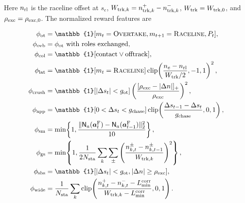 \documentclass[journal,twoside,web]{ieeecolor}
\begin{document}
\begin{samepage}
Here \(n_{\rm rl}\) is the raceline offset at \(s_e\),
\(W_{{\rm trk},k}=n_{{\rm trk},k}^{+}-n_{{\rm trk},k}^{-}\),
\(W_{\rm trk}=W_{{\rm trk},0}\), and
\(\rho_{\rm exc}=\rho_{{\rm exc},0}\). The normalized reward features are
\par
\end{samepage}
\begingroup
\scriptsize
\setlength{\jot}{0.5pt}
\begin{equation}
\begin{aligned}
\phi_{\rm ot}&=\mathbb{1}[m_t=\textsc{Overtake},
m_{t+1}=\textsc{Raceline},P_t],\\
\phi_{\rm ovb}&=\phi_{\rm ot}\text{ with roles exchanged},\\
\phi_{\rm col}&=\mathbb{1}[\mathrm{contact}\vee\mathrm{offtrack}],\\
\phi_{\rm lat}&=\mathbb{1}[m_t=\textsc{Raceline}]
\operatorname{clip}\!\left(\frac{n_e-n_{\rm rl}}{W_{\rm trk}/2},-1,1\right)^2,\\
\phi_{\rm crush}&=\mathbb{1}[|\Delta s_t|<g_{\rm ot}]
\left(\frac{[\rho_{\rm exc}-|\Delta n|]_+}{\rho_{\rm exc}}\right)^2,\\
\phi_{\rm app}&=\mathbb{1}[0<\Delta s_t<g_{\rm chase}]
\operatorname{clip}\!\left(\frac{\Delta s_{t-1}-\Delta s_t}{g_{\rm chase}},0,1\right),\\
\phi_{\rm sm}&=\min\!\left\{1,
\frac{\|\mathsf N_a(\bm a_t^{\rm F})-
\mathsf N_a(\bm a_{t-1}^{\rm F})\|_2^2}{10}\right\},\\
\phi_{\rm gs}&=\min\!\left\{1,\frac{1}{2N_{\rm sta}}
\sum_k\sum_{\pm}\left(\frac{n_{k,t}^{\pm}-n_{k,t-1}^{\pm}}
{W_{{\rm trk},k}}\right)^2\right\},\\
\phi_{\rm sbs}&=\mathbb{1}[|\Delta s_t|<g_{\rm ot},
|\Delta n|\ge\rho_{\rm exc}],\\
\phi_{\rm wide}&=\frac{1}{N_{\rm sta}}\sum_k
\operatorname{clip}\!\left(\frac{n_{k,t}^+-n_{k,t}^--L_{\min}^{\rm corr}}
{W_{{\rm trk},k}-L_{\min}^{\rm corr}},0,1\right).
\end{aligned}
\label{eq:reward_features}
\end{equation}
\endgroup
\end{document}
